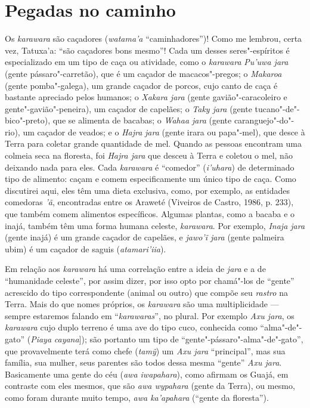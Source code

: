 \section{Pegadas no caminho}\label{pegadas-no-caminho}

Os \emph{karawara} são caçadores (\emph{watama'a} ``caminhadores'')!
Como me lembrou, certa vez, Tatuxa'a: ``são caçadores bons mesmo''! Cada
um desses seres"-espíritos é especializado em um tipo de caça ou
atividade, como o \emph{karawara} \emph{Pu'uwa jara} (gente
pássaro"-carretão), que é um caçador de macacos"-pregos; o \emph{Makaroa}
(gente pomba"-galega), um grande caçador de porcos, cujo canto de caça é
bastante apreciado pelos humanos; o \emph{Xakara jara} (gente
gavião"-caracoleiro e gente"-gavião"-peneira), um caçador de capelães; o
\emph{Taky jara} (gente tucano"-de"-bico"-preto), que se alimenta de
bacabas; o \emph{Wahaa jara} (gente caranguejo"-do"-rio), um caçador de
veados; e o \emph{Hajra} \emph{jara} (gente irara ou papa"-mel), que
desce à Terra para coletar grande quantidade de mel. Quando as pessoas
encontram uma colmeia seca na floresta, foi \emph{Hajra jara} que desceu
à Terra e coletou o mel, não deixando nada para eles. Cada
\emph{karawara} é ``comedor'' (\emph{i'uhara}) de determinado tipo de
alimento: caçam e comem especificamente um único tipo de caça. Como
discutirei aqui, eles têm uma dieta exclusiva, como, por exemplo, as
entidades comedoras \emph{'ã}, encontradas entre os Araweté (Viveiros de
Castro, 1986, p. 233), que também comem alimentos específicos. Algumas
plantas, como a bacaba e o inajá, também têm uma forma humana celeste,
\emph{karawara}. Por exemplo, \emph{Inaja jara} (gente inajá) é um
grande caçador de capelães, e \emph{jawo'ĩ jara} (gente palmeira ubim) é
um caçador de saguis (\emph{atamari'iia}).

Em relação aos \emph{karawara} há uma correlação entre a ideia de
\emph{jara} e a de ``humanidade celeste'', por assim dizer, por isso opto
por chamá"-los de ``gente'' acrescido do tipo correspondente (animal ou
outro) que compõe seu \emph{rastro} na Terra. Mais do que nomes
próprios, os \emph{karawara} são uma multiplicidade --- sempre estaremos
falando em ``\emph{karawaras}'', no plural. Por exemplo \emph{Axu jara},
os \emph{karawara} cujo duplo terreno é uma ave do tipo cuco, conhecida
como ``alma"-de"-gato'' (\emph{Piaya} \emph{cayana}{]}); são portanto um
tipo de ``gente"-pássaro"-alma"-de"-gato'', que provavelmente terá como
chefe (\emph{tamỹ}) um \emph{Axu jara} ``principal'', mas sua família,
sua mulher, seus parentes são todos dessa mesma ``gente'' \emph{Axu
jara}. Basicamente uma gente do céu (\emph{awa iwapahara}), como afirmam
os Guajá, em contraste com eles mesmos, que são \emph{awa wypahara}
(gente da Terra), ou mesmo, como foram durante muito tempo, \emph{awa
ka'apahara} (``gente da floresta'').

